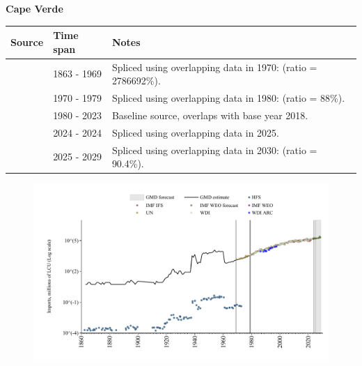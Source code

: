 \documentclass[12pt,a4paper,landscape]{article}
\begin{document}
\begin{adjustbox}{max totalsize={\paperwidth}{\paperheight},center}
\begin{minipage}[t][\textheight][t]{\textwidth}
\vspace*{0.5cm}
{}
\begin{center}
{\Large\bfseries Cape Verde}
\end{center}
\vspace{0.5cm}
\begin{table}[H]
\centering
\small
\begin{tabular}{|l|l|l|}
\hline
\textbf{Source} & \textbf{Time span} & \textbf{Notes} \\
\hline
\rowcolor{white}\cite{HFS}& 1863 - 1969 &Spliced using overlapping data in 1970: (ratio = 2786692\%).\\
\rowcolor{lightgray}\cite{UN}& 1970 - 1979 &Spliced using overlapping data in 1980: (ratio = 88\%).\\
\rowcolor{white}\cite{WDI}& 1980 - 2023 &Baseline source, overlaps with base year 2018.\\
\rowcolor{lightgray}\cite{IMF_IFS}& 2024 - 2024 &Spliced using overlapping data in 2025.\\
\rowcolor{white}\cite{IMF_WEO_forecast}& 2025 - 2029 &Spliced using overlapping data in 2030: (ratio = 90.4\%).\\
\hline
\end{tabular}
\end{table}
\begin{figure}[H]
\centering
\includegraphics[width=\textwidth,height=0.6\textheight,keepaspectratio]{graphs/CPV_imports.pdf}
\end{figure}
\end{minipage}
\end{adjustbox}
\end{document}
